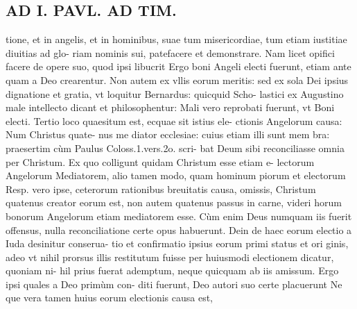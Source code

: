 \documentclass{article}
\begin{document}
\begin{pages}
\section*{AD I. PAVL. AD TIM. }
\marginpar{[ p.334 ]}\pstart tione, et in angelis, et in hominibus, suae tum misericordiae, tum etiam iustitiae diuitias ad glo- riam nominis sui, patefacere et demonstrare. Nam licet opifici facere de opere suo, quod ipsi libucrit Ergo boni Angeli electi fuerunt, etiam ante quam a Deo crearentur. Non autem ex vllis eorum meritis: sed ex sola Dei ipsius dignatione et gratia, vt loquitur Bernardus: quicquid Scho- lastici ex Augustino male intellecto dicant et philosophentur: Mali vero reprobati fuerunt, vt Boni electi.  \pend\pstart Tertio loco quaesitum est, ecquae sit istius ele- ctionis Angelorum causa: Num Christus quate- nus me diator ecclesiae: cuius etiam illi sunt mem bra: praesertim cùm Paulus Coloss.1.vers.2o. scri- bat Deum sibi reconciliasse omnia per Christum. Ex quo colligunt quidam Christum esse etiam e- lectorum Angelorum Mediatorem, alio tamen modo, quam hominum piorum et electorum Resp. vero ipse, ceterorum rationibus breuitatis causa, omissis, Christum quatenus creator eorum est, non autem quatenus passus in carne, videri horum bonorum Angelorum etiam mediatorem esse. Cùm enim Deus numquam iis fuerit offensus, nulla reconciliatione certe opus habuerunt. Dein de haec eorum electio a Iuda desinitur conserua- tio et confirmatio ipsius eorum primi status et ori ginis, adeo vt nihil prorsus illis restitutum fuisse per huiusmodi electionem dicatur, quoniam ni- hil prius fuerat ademptum, neque quicquam ab iis amissum. Ergo ipsi quales a Deo primùm con- diti fuerunt, Deo autori suo certe placuerunt Ne que vera tamen huius eorum electionis causa est,  \pend

\end{pages}
\end{document}
